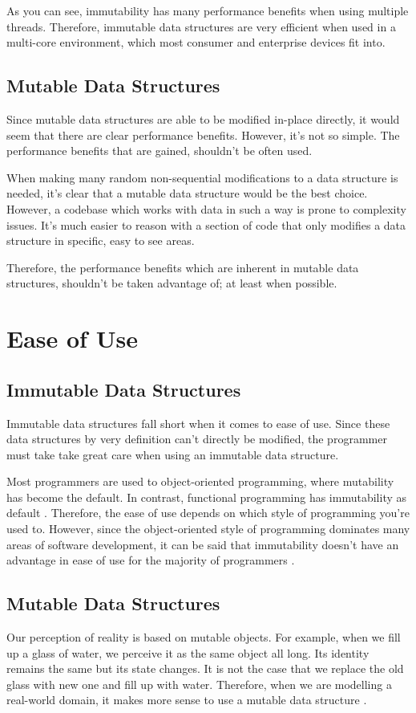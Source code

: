 \documentclass[11pt]{article}
\begin{document}
As you can see, immutability has many performance benefits when using multiple
threads. Therefore, immutable data structures are very efficient when used in a
multi-core environment, which most consumer and enterprise devices fit into.

\subsection{Mutable Data Structures}
Since mutable data structures are able to be modified in-place directly, it
would seem that there are clear performance benefits. However, it's
not so simple. The performance benefits that are gained, shouldn't be often
used.

When making many random non-sequential modifications to a data structure is
needed, it's clear that a mutable data structure would be the best choice.
However, a codebase which works with data in such a way is prone to complexity
issues. It's much easier to reason with a section of code that only modifies a
data structure in specific, easy to see areas.

Therefore, the performance benefits which are inherent in mutable data
structures, shouldn't be taken advantage of; at least when possible.
\clearpage

\section{Ease of Use}
\subsection{Immutable Data Structures}
Immutable data structures fall short when it comes to ease of use. Since these
data structures by very definition can't directly be modified, the programmer
must take take great care when using an immutable data structure.

Most programmers are used to object-oriented programming, where mutability has
become the default. In contrast, functional programming has immutability as
default \cite{miles}. Therefore, the ease of use depends on which style of
programming you're used to. However, since the object-oriented style of
programming dominates many areas of software development, it can be said that
immutability doesn't have an advantage in ease of use for the majority of
programmers \cite{ieee_spectrum}.

\subsection{Mutable Data Structures}
Our perception of reality is based on mutable objects. For example, when we
fill up a glass of water, we perceive it as the same object all long. Its
identity remains the same but its state changes. It is not the case that we
replace the old glass with new one and fill up with water. Therefore, when we
are modelling a real-world domain, it makes more sense to use a mutable data
structure \cite{peter_toro}.
\end{document}
